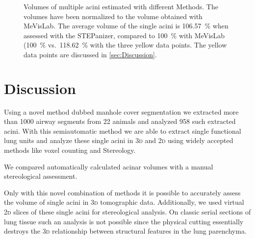\documentclass[%
	paper=a4,%
	abstract=true,%
	]{scrartcl}
\newcommand{\twod}{2\textsc{d}\xspace}
\newcommand{\threed}{3\textsc{d}\xspace}
\begin{document}
\begin{figure}[htb]
	\centering
	\caption{Volumes of multiple acini estimated with different Methods. The volumes have been normalized to the volume obtained with MeVisLab. The average volume of the single acini is \SI{106.57}{\percent} when assessed with the STEPanizer, compared to \SI{100}{\percent} with MeVisLab (\SI{100}{\percent} vs.\ \SI{118.62}{\percent} with the three yellow data points.%
	The yellow data points are discussed in \autoref{sec:Discussion}.}
	\label{fig:VolumeMeVisVsSTEPanizer}
\end{figure}

\section{Discussion\label{sec:Discussion}}
Using a novel method dubbed manhole cover segmentation we extracted more than 1000 airway segments from 22 animals and analyzed 958 such extracted acini. With this semiautomatic method we are able to extract single functional lung units and analyze these single acini in \threed and \twod using widely accepted methods like voxel counting and Stereology.

We compared automatically calculated acinar volumes with a manual stereological assessment.

Only with this novel combination of methods it is possible to accurately assess the volume of single acini in \threed tomographic data. Additionally, we used virtual \twod slices of these single acini for stereological analysis. On classic serial sections of lung tissue such an analysis is not possible since the physical cutting essentially destroys the \threed relationship between structural features in the lung parenchyma.
\end{document}
